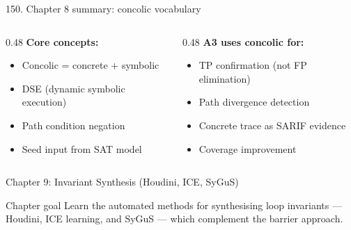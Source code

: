 \documentclass[aspectratio=169]{beamer}
\begin{document}
\begin{frame}{150. Chapter 8 summary: concolic vocabulary}
\begin{columns}
\begin{column}{0.48\textwidth}
\textbf{Core concepts:}
\begin{itemize}
  \item Concolic = concrete + symbolic
  \item DSE (dynamic symbolic execution)
  \item Path condition negation
  \item Seed input from SAT model
\end{itemize}
\end{column}
\begin{column}{0.48\textwidth}
\textbf{A3 uses concolic for:}
\begin{itemize}
  \item TP confirmation (not FP elimination)
  \item Path divergence detection
  \item Concrete trace as SARIF evidence
  \item Coverage improvement
\end{itemize}
\end{column}
\end{columns}
\end{frame}


\begin{frame}{Chapter 9: Invariant Synthesis (Houdini, ICE, SyGuS)}
\begin{block}{Chapter goal}
Learn the automated methods for synthesising loop invariants --- Houdini, ICE learning,
and SyGuS --- which complement the barrier approach.
\end{block}
\end{frame}
\end{document}

